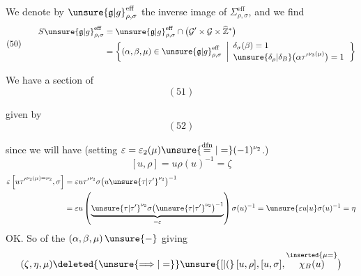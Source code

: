 We denote by
\(\unsure{\mathfrak{g}|g}_{\rho,\sigma}^{\mathrm{eff}}\)
the inverse image of
\(\Sigma_{\rho,\sigma}^{\mathrm{eff}}\),
and we find
\[
(50)\qquad
\begin{aligned}
S\unsure{\mathfrak{g}|g}_{\rho,\sigma}^{\mathrm{eff}}
&=\unsure{\mathfrak{g}|g}_{\rho,\sigma}^{\mathrm{eff}}
\cap\bigl(\mathcal{G}'\times\mathcal{G}\times\widehat{\mathbb Z}^{*}\bigr)
\\
&=\left\{(\alpha,\beta,\mu)\in
\unsure{\mathfrak{g}|g}_{\rho,\sigma}^{\mathrm{eff}}
\ \left|
\begin{array}{l}
\delta_\sigma(\beta)=1\\
\unsure{\delta_\rho|\delta_B}\bigl(\alpha{\tau'}^{\nu_3(\mu)}\bigr)=1
\end{array}\right.\right\}
\end{aligned}
\]

We have a section of
\[
(51)
\]

given by
\[
(52)
\]

since we will have
(setting \(\varepsilon=\varepsilon_2(\mu)
\unsure{\overset{\mathrm{dfn}}{=}|=}
(-1)^{\nu_2}\).)
\[
[u,\rho]=u\rho(u)^{-1}=\zeta
\]
\[
\begin{aligned}
\varepsilon
\left[u{\tau'}^{\nu_2(\mu)=\nu_2},\sigma\right]
&=\varepsilon u{\tau'}^{\nu_2}
\sigma\bigl(u\unsure{\tau|\tau'}^{\nu_2}\bigr)^{-1}\\
&=\varepsilon u
\left(\underbrace{
\unsure{\tau|\tau'}^{\nu_2}
\sigma\bigl(\unsure{\tau|\tau'}^{\nu_2}\bigr)^{-1}
}_{=\varepsilon}\right)\sigma(u)^{-1}
=\unsure{\varepsilon u|u}\sigma(u)^{-1}=\eta
\end{aligned}
\]
OK. So
of the \((\alpha,\beta,\mu)\,\unsure{-}\)
giving 
\[
(\zeta,\eta,\mu)\deleted{\unsure{\Longrightarrow|=}}
\unsure{[|(}\,[u,\rho],[u,\sigma],
\overset{\inserted{\mu=}}{\chi_B(u)}\bigr)
\]

